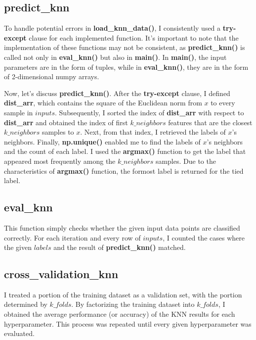 \documentclass[12pt]{article}
\begin{document}
\subsection{predict\_knn}

To handle potential errors in \textbf{load\_knn\_data()}, I consistently used a \textbf{try-except} clause for each implemented function. It's important to note that the implementation of these functions may not be consistent, as \textbf{predict\_knn()} is called not only in \textbf{eval\_knn()} but also in \textbf{main()}. In \textbf{main()}, the input parameters are in the form of tuples, while in \textbf{eval\_knn()}, they are in the form of 2-dimensional numpy arrays.

Now, let's discuss \textbf{predict\_knn()}. After the \textbf{try-except} clause, I defined \textbf{dist\_arr}, which contains the square of the Euclidean norm from $x$ to every sample in $inputs$. Subsequently, I sorted the index of \textbf{dist\_arr} with respect to \textbf{dist\_arr} and obtained the index of first $k\_neighbors$ features that are the closest $k\_neighbors$ samples to $x$. Next, from that index, I retrieved the labels of $x$'s neighbors. Finally, \textbf{np.unique()} enabled me to find the labels of $x$'s neighbors and the count of each label. I used the \textbf{argmax()} function to get the label that appeared most frequently among the $k\_neighbors$ samples.  Due to the characteristics of \textbf{argmax()} function, the formost label is returned for the tied label.

\subsection{eval\_knn}

This function simply checks whether the given input data points are classified correctly. For each iteration and every row of $inputs$, I counted the cases where the given $labels$ and the result of \textbf{predict\_knn()} matched.

\subsection{cross\_validation\_knn}

I treated a portion of the training dataset as a validation set, with the portion determined by $k\_folds$. By factorizing the training dataset into $k\_folds$, I obtained the average performance (or accuracy) of the KNN results for each hyperparameter. This process was repeated until every given hyperparameter was evaluated.
\end{document}
